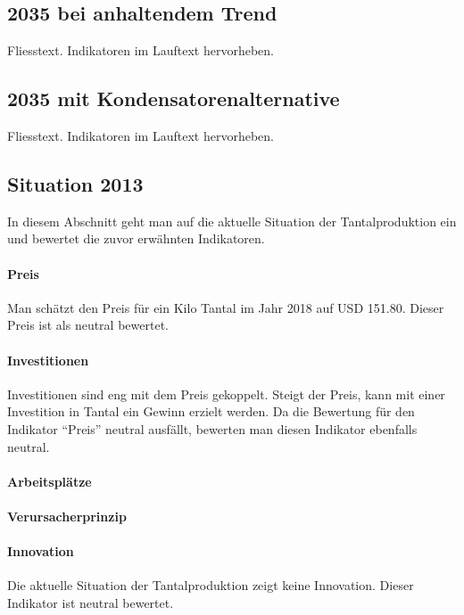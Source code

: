 \subsection{2035 bei anhaltendem Trend}
Fliesstext. Indikatoren im Lauftext hervorheben.

\subsection{2035 mit Kondensatorenalternative}
Fliesstext. Indikatoren im Lauftext hervorheben.

\iffalse

\subsection{Situation 2013}
In diesem Abschnitt geht man auf die aktuelle Situation der Tantalproduktion ein
und bewertet die zuvor erwähnten Indikatoren.

\paragraph{Preis}
Man schätzt den Preis für ein Kilo Tantal im Jahr 2018 auf USD
151.80.\cite{tantal_price} Dieser Preis ist als neutral bewertet.

\paragraph{Investitionen}
Investitionen sind eng mit dem Preis gekoppelt. Steigt der Preis, kann mit einer
Investition in Tantal ein Gewinn erzielt werden. Da die Bewertung für den
Indikator ``Preis'' neutral ausfällt, bewerten man diesen Indikator ebenfalls
neutral.

\paragraph{Arbeitsplätze}

\paragraph{Verursacherprinzip}

\paragraph{Innovation}
Die aktuelle Situation der Tantalproduktion zeigt keine Innovation. Dieser
Indikator ist neutral bewertet.

